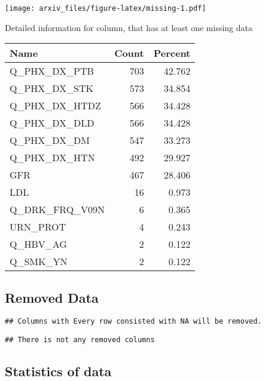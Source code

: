 \documentclass{article}
\begin{document}
\texttt{[image: arxiv\_files/figure-latex/missing-1.pdf]}

Detailed information for column, that has at least one missing data

\begin{table}
\centering
\begin{tabular}{l|r|r}
\hline
Name & Count & Percent\\
\hline
Q\_PHX\_DX\_PTB & 703 & 42.762\\
\hline
Q\_PHX\_DX\_STK & 573 & 34.854\\
\hline
Q\_PHX\_DX\_HTDZ & 566 & 34.428\\
\hline
Q\_PHX\_DX\_DLD & 566 & 34.428\\
\hline
Q\_PHX\_DX\_DM & 547 & 33.273\\
\hline
Q\_PHX\_DX\_HTN & 492 & 29.927\\
\hline
GFR & 467 & 28.406\\
\hline
LDL & 16 & 0.973\\
\hline
Q\_DRK\_FRQ\_V09N & 6 & 0.365\\
\hline
URN\_PROT & 4 & 0.243\\
\hline
Q\_HBV\_AG & 2 & 0.122\\
\hline
Q\_SMK\_YN & 2 & 0.122\\
\hline
\end{tabular}
\end{table}

\newpage

\hypertarget{removed-data}{%
\subsection{Removed Data}\label{removed-data}}

\begin{verbatim}
## Columns with Every row consisted with NA will be removed.
\end{verbatim}

\begin{verbatim}
## There is not any removed columns
\end{verbatim}

\newpage

\hypertarget{statistics-of-data}{%
\subsection{Statistics of data}\label{statistics-of-data}}
\end{document}

